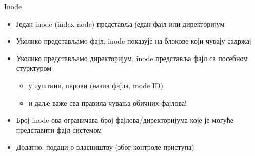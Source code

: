 \documentclass[xcolor=table]{beamer}
\begin{document}
    \begin{frame}[allowframebreaks]{Inode}
        \begin{itemize}
            \item Један inode (index node) представља један фајл или директоријум
            \item Уколико представљамо фајл, inode показује на блокове који чувају садржај
            \item Уколико представљамо директоријум, inode представља фајл са посебном стурктуром
            \begin{itemize}
                \item у суштини, парови (назив фајла, inode ID)
                \item и даље важе сва правила чувања обичних фајлова!
            \end{itemize}
            \item Број inode-ова ограничава број фајлова/директоријума које је могуће представити фајл системом
            \item Додатно: подаци о власништву (због контроле приступа)
        \end{itemize}
        
        \framebreak
        

\end{frame}
\end{document}
